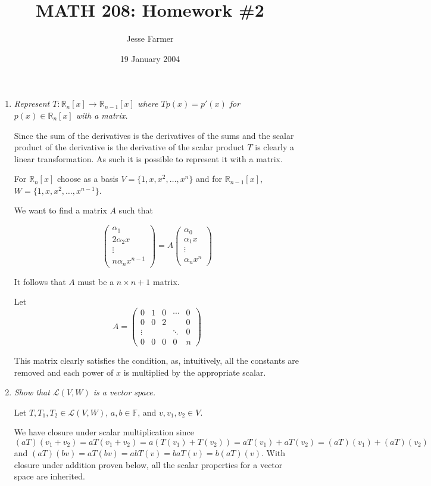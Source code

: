 \documentclass[11pt]{article}
\title{MATH 208: Homework \#2}
\author{Jesse Farmer}
\date{19 January 2004}
\begin{document}
\maketitle
\begin{enumerate}
\item \emph{Represent $T: \mathbb{R}_n[x] \rightarrow \mathbb{R}_{n-1}[x]$ where $Tp(x) = p'(x)$ for $p(x) \in \mathbb{R}_n[x]$ with a matrix.}

Since the sum of the derivatives is the derivatives of the sums and the scalar product of the derivative is the derivative of the scalar product $T$ is clearly a linear transformation.  As such it is possible to represent it with a matrix.


For $\mathbb{R}_n[x]$ choose as a basis $V = \{1,x,x^2,\ldots,x^n\}$ and for $\mathbb{R}_{n-1}[x]$, $W = \{1,x,x^2,\ldots,x^{n-1}\}$.

We want to find a matrix $A$ such that 

\[ 
\left(\begin{array}{c} \alpha_1 \\ 2\alpha_2x \\ \vdots \\ n\alpha_nx^{n-1} \end{array} \right) = 
A \left(\begin{array}{c} \alpha_0 \\ \alpha_1x \\ \vdots \\ \alpha_nx^n \end{array} \right)
\]

It follows that $A$ must be a $n \times n+1$ matrix.

Let 
\[ A = \left( \begin{array}{ccccc}
0 & 1 & 0 & \cdots & 0 \\
0 & 0 & 2 &  & 0\\
\vdots & &  & \ddots & 0 \\
0 & 0 & 0 & 0 & n\end{array} \right)\]

This matrix clearly satisfies the condition, as, intuitively, all the constants are removed and each power of $x$ is multiplied by the appropriate scalar.

\item \emph{Show that $\mathcal{L}(V,W)$ is a vector space.}

Let $T,T_1,T_2 \in \mathcal{L}(V,W)$, $a,b \in \mathbb{F}$, and $v,v_1,v_2 \in V$.

We have closure under scalar multiplication since $(aT)(v_1 + v_2) = aT(v_1+v_2) = a(T(v_1)+T(v_2)) = aT(v_1) + aT(v_2) = (aT)(v_1) + (aT)(v_2)$ and $(aT)(bv) = aT(bv) = abT(v) = baT(v) = b(aT)(v)$.  With closure under addition proven below, all the scalar properties for a vector space are inherited.


\end{enumerate}
\end{document}
